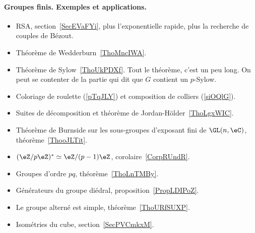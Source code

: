 \paragraph{Groupes finis. Exemples et applications.}
\begin{itemize}
    \item RSA, section~\ref{SecEVaFYi}, plus l'exponentielle rapide, plus la recherche de couples de Bézout.
    \item Théorème de Wedderburn~\ref{ThoMncIWA}.
    \item Théorème de Sylow~\ref{ThoUkPDXf}. Tout le théorème, c'est un peu long. On peut se contenter de la partie qui dit que \( G\) contient un \( p\)-Sylow.
    \item Coloriage de roulette (\ref{pTqJLY}) et composition de colliers (\ref{siOQlG}).
    \item Suites de décomposition et théorème de Jordan-Hölder~\ref{ThoLgxWIC}.
    \item Théorème de Burnside sur les sous-groupes d'exposant fini de \( \GL(n,\eC)\), théorème~\ref{ThooJLTit}.
    \item \( (\eZ/p\eZ)^*\simeq \eZ/(p-1)\eZ\), corolaire~\ref{CorpRUndR}.
    \item Groupes d'ordre \( pq\), théorème~\ref{ThoLnTMBy}.
    \item Générateurs du groupe diédral, proposition~\ref{PropLDIPoZ}.
    \item Le groupe alterné est simple, théorème~\ref{ThoURfSUXP}.
    \item Isométries du cube, section~\ref{SecPVCmkxM}.
\end{itemize}



